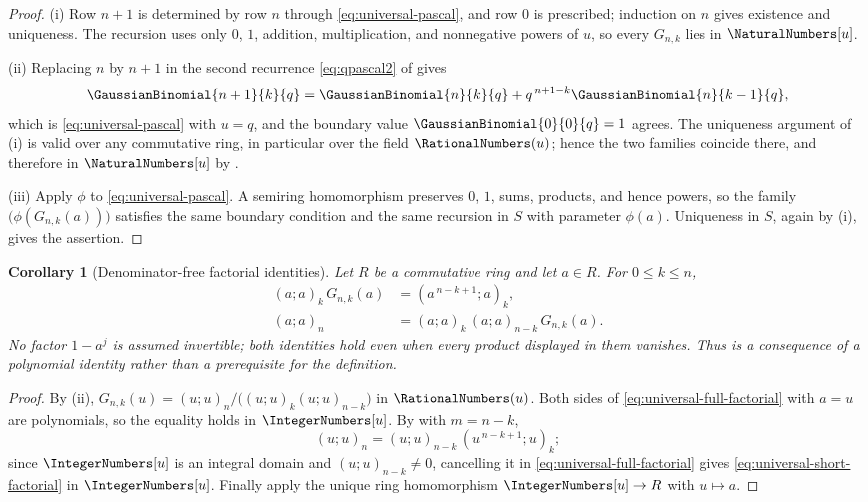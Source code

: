\documentclass[11pt,a4paper,oneside,openany]{book}
\newtheorem{corollary}[corollary]{Corollary}
\theoremstyle{definition}
\theoremstyle{remark}
\begin{document}
\begin{proof}
(i)  Row $n+1$ is determined by row $n$ through \eqref{eq:universal-pascal}, and row $0$ is prescribed; induction on $n$ gives existence and uniqueness.  The recursion uses only $0$, $1$, addition, multiplication, and nonnegative powers of $u$, so every $G_{n,k}$ lies in $\NaturalNumbers[u]$.

(ii)  Replacing $n$ by $n+1$ in the second recurrence \eqref{eq:qpascal2} of  gives
\[
 \GaussianBinomial{n+1}{k}{q}=\GaussianBinomial{n}{k}{q}+q^{\,n+1-k}\GaussianBinomial{n}{k-1}{q},
\]
which is \eqref{eq:universal-pascal} with $u=q$, and the boundary value $\GaussianBinomial{0}{0}{q}=1$ agrees.  The uniqueness argument of (i) is valid over any commutative ring, in particular over the field $\RationalNumbers(u)$; hence the two families coincide there, and therefore in $\NaturalNumbers[u]$ by .

(iii)  Apply $\phi$ to \eqref{eq:universal-pascal}.  A semiring homomorphism preserves $0$, $1$, sums, products, and hence powers, so the family $\bigl(\phi(G_{n,k}(a))\bigr)$ satisfies the same boundary condition and the same recursion in $S$ with parameter $\phi(a)$.  Uniqueness in $S$, again by (i), gives the assertion.
\end{proof}

\begin{corollary}[Denominator-free factorial identities]\label{cor:universal-factorial-identities}
Let $R$ be a commutative ring and let $a\in R$.  For $0\le k\le n$,
\begin{align}
 (a;a)_k\,G_{n,k}(a)&=(a^{\,n-k+1};a)_k,\label{eq:universal-short-factorial}\\
 (a;a)_n&=(a;a)_k\,(a;a)_{n-k}\,G_{n,k}(a).\label{eq:universal-full-factorial}
\end{align}
No factor $1-a^j$ is assumed invertible; both identities hold even when every product displayed in them vanishes.  Thus  is a consequence of a polynomial identity rather than a prerequisite for the definition.
\end{corollary}

\begin{proof}
By (ii), $G_{n,k}(u)=(u;u)_n/\bigl((u;u)_k(u;u)_{n-k}\bigr)$ in $\RationalNumbers(u)$.  Both sides of \eqref{eq:universal-full-factorial} with $a=u$ are polynomials, so the equality holds in $\IntegerNumbers[u]$.  By  with $m=n-k$,
\[
 (u;u)_n=(u;u)_{n-k}\,(u^{\,n-k+1};u)_k;
\]
since $\IntegerNumbers[u]$ is an integral domain and $(u;u)_{n-k}\ne0$, cancelling it in \eqref{eq:universal-full-factorial} gives \eqref{eq:universal-short-factorial} in $\IntegerNumbers[u]$.  Finally apply the unique ring homomorphism $\IntegerNumbers[u]\to R$ with $u\mapsto a$.
\end{proof}
\end{document}
